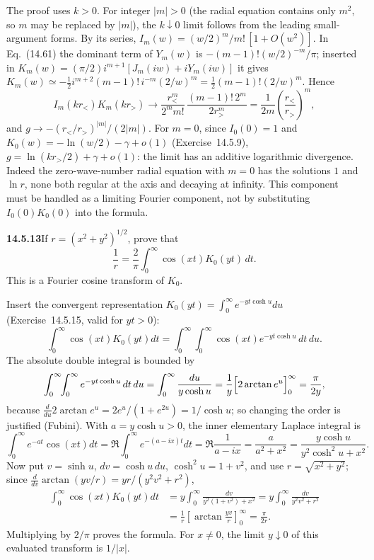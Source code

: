 The proof uses $k>0$. For integer $|m|>0$ (the radial equation
contains only $m^2$, so $m$ may be replaced by $|m|$), the
$k\downarrow0$ limit follows from the leading small-argument forms.
By its series, $I_m(w)=(w/2)^m/m!\,[1+O(w^2)]$. In Eq.~(14.61) the
dominant term of $Y_m(w)$ is $-(m-1)!(w/2)^{-m}/\pi$; inserted in
$K_m(w)=(\pi/2)i^{m+1}[J_m(iw)+iY_m(iw)]$ it gives
$K_m(w)\simeq-\frac12i^{m+2}(m-1)!\,i^{-m}(2/w)^m
=\frac12(m-1)!(2/w)^m$. Hence
\[
I_m(kr_<)K_m(kr_>)\longrightarrow
\frac{r_<^m}{2^mm!}\,\frac{(m-1)!\,2^m}{2r_>^m}
=\frac1{2m}\left(\frac{r_<}{r_>}\right)^m,
\]
and $g\to-(r_</r_>)^{|m|}/(2|m|)$. For $m=0$, since $I_0(0)=1$ and
$K_0(w)=-\ln(w/2)-\gamma+o(1)$ (Exercise~14.5.9),
$g=\ln(kr_>/2)+\gamma+o(1)$: the limit has an additive logarithmic
divergence. Indeed the zero-wave-number radial equation with $m=0$
has the solutions $1$ and $\ln r$, none both regular at the axis
and decaying at infinity. This component must be handled as a
limiting Fourier component, not by substituting $I_0(0)K_0(0)$
into the formula.

\par\bigskip
\noindent\textbf{14.5.13}\quad If $r=(x^{2}+y^{2})^{1/2}$, prove that
\[
\frac{1}{r}=\frac{2}{\pi}\int_{0}^{\infty}\cos(xt)K_{0}(yt)\,dt.
\]
This is a Fourier cosine transform of $K_{0}$.
\par{}
\solution
{}
Insert the convergent representation
$K_0(yt)=\int_0^\infty e^{-yt\cosh u}du$ (Exercise~14.5.15, valid
for $yt>0$):
\[
\int_0^\infty\cos(xt)K_0(yt)dt
=\int_0^\infty\int_0^\infty
\cos(xt)e^{-yt\cosh u}\,dt\,du.
\]
The absolute double integral is bounded by
\[
\int_0^\infty\!\!\int_0^\infty e^{-yt\cosh u}\,dt\,du
=\int_0^\infty\frac{du}{y\cosh u}
=\frac1y\Bigl[2\arctan e^u\Bigr]_0^\infty=\frac\pi{2y},
\]
because $\frac d{du}2\arctan e^u=2e^u/(1+e^{2u})=1/\cosh u$; so
changing the order is justified (Fubini). With $a=y\cosh u>0$,
the inner elementary Laplace integral is
\[
\int_0^\infty e^{-at}\cos(xt)dt
=\Re\int_0^\infty e^{-(a-ix)t}dt=\Re\frac1{a-ix}
=\frac{a}{a^2+x^2}
=\frac{y\cosh u}{y^2\cosh^2u+x^2}.
\]
Now put $v=\sinh u$, $dv=\cosh u\,du$, $\cosh^2u=1+v^2$, and use
$r=\sqrt{x^2+y^2}$; since
$\frac d{dv}\arctan(yv/r)=yr/(y^2v^2+r^2)$,
\begin{align*}
\int_0^\infty\cos(xt)K_0(yt)dt
&=y\int_0^\infty\frac{dv}{y^2(1+v^2)+x^2}
=y\int_0^\infty\frac{dv}{y^2v^2+r^2}\\
&=\frac1r
\left[\arctan\frac{yv}r\right]_0^\infty
=\frac\pi{2r}.
\end{align*}
Multiplying by $2/\pi$ proves the formula. For $x\ne0$,
the limit $y\downarrow0$ of this evaluated transform is $1/|x|$.

